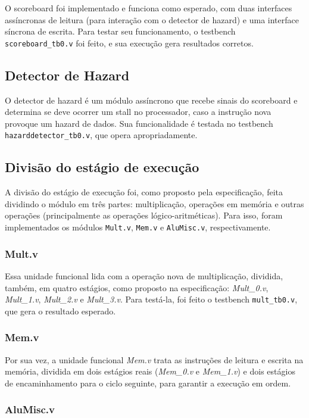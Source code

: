 \documentclass[12pt,a4paper]{article}
\numberwithin{equation}{section}
\begin{document}
O scoreboard foi implementado e funciona como esperado, com duas interfaces assíncronas de leitura (para interação com o detector de hazard) e uma interface síncrona de escrita. Para testar seu funcionamento, o testbench \verb|scoreboard_tb0.v| foi feito, e sua execução gera resultados corretos.

\subsection{Detector de Hazard}

O detector de hazard é um módulo assíncrono que recebe sinais do scoreboard e determina se deve ocorrer um stall no processador, caso a instrução nova provoque um hazard de dados. Sua funcionalidade é testada no testbench \verb|hazarddetector_tb0.v|, que opera apropriadamente.

\subsection{Divisão do estágio de execução}

A divisão do estágio de execução foi, como proposto pela especificação, feita dividindo o módulo em três partes: multiplicação, operações em memória e outras operações (principalmente as operações lógico-aritméticas). Para isso, foram implementados os módulos \verb|Mult.v|, \verb|Mem.v| e \verb|AluMisc.v|, respectivamente.

\subsubsection{Mult.v}

Essa unidade funcional lida com a operação nova de multiplicação, dividida, também, em quatro estágios, como proposto na especificação: \emph{Mult\_0.v}, \emph{Mult\_1.v}, \emph{Mult\_2.v} e \emph{Mult\_3.v}. Para testá-la, foi feito o testbench \verb|mult_tb0.v|, que gera o resultado esperado.

\subsubsection{Mem.v}

Por sua vez, a unidade funcional \emph{Mem.v} trata as instruções de leitura e escrita na memória, dividida em dois estágios reais (\emph{Mem\_0.v} e \emph{Mem\_1.v}) e dois estágios de encaminhamento para o ciclo seguinte, para garantir a execução em ordem.

\subsubsection{AluMisc.v}
\end{document}
